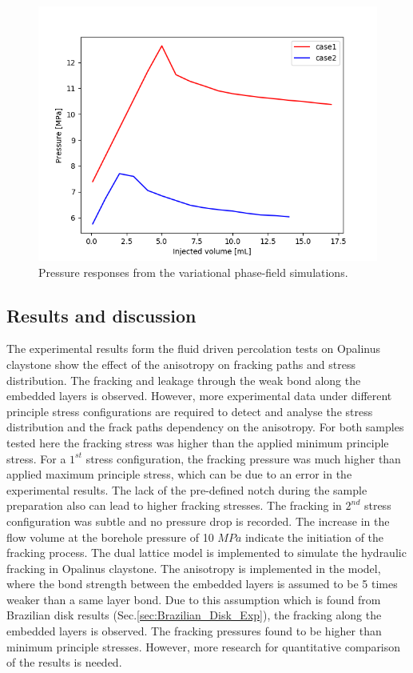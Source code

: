 \begin{figure}[!ht]
\centering
\includegraphics[width=1.0\textwidth]{figures/Keita_ME2_pressures.png}
\caption{Pressure responses from the variational phase-field simulations.}
\label{fig:Keita_ME2_VPF_pres}
\end{figure}

\subsection{Results and discussion}
The experimental results form the fluid driven percolation tests on Opalinus claystone show the effect of the anisotropy on fracking paths and stress distribution. The fracking and leakage through the weak bond along the embedded layers is observed. However, more experimental data under different principle stress configurations are required to detect and analyse the stress distribution and the frack paths dependency on the anisotropy. For both samples tested here the fracking stress was higher than the applied minimum principle stress. For a $1^{st}$ stress configuration, the fracking pressure was much higher than applied maximum principle stress, which can be due to an error in the experimental results. The lack of the pre-defined notch during the sample preparation also can lead to higher fracking stresses. The fracking in $2^{nd}$ stress configuration was subtle and no pressure drop is recorded. The increase in the flow volume at the borehole pressure of 10 $MPa$ indicate the initiation of the fracking process. The dual lattice model is implemented to simulate the hydraulic fracking in Opalinus claystone. The anisotropy is implemented in the model, where the bond strength between the embedded layers is assumed to be 5 times weaker than a same layer bond. Due to this assumption which is found from Brazilian disk results (Sec.\ref{sec:Brazilian_Disk_Exp}), the fracking along the embedded layers is observed. The fracking pressures found to be higher than minimum principle stresses. However, more research for quantitative comparison of the results is needed. 


